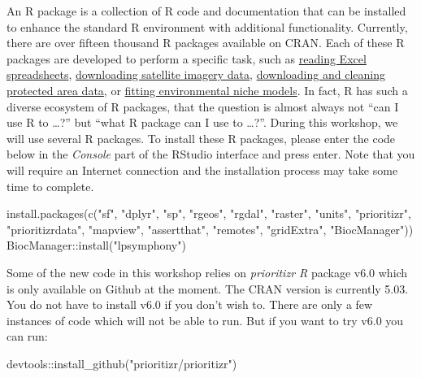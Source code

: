 \documentclass[
  12pt,
]{book}
\newenvironment{Shaded}{\begin{snugshade}}{\end{snugshade}}
\newcommand{\FunctionTok}[1]{\textcolor[rgb]{0.00,0.00,0.00}{#1}}
\newcommand{\NormalTok}[1]{#1}
\newcommand{\SpecialCharTok}[1]{\textcolor[rgb]{0.00,0.00,0.00}{#1}}
\newcommand{\StringTok}[1]{\textcolor[rgb]{0.31,0.60,0.02}{#1}}
\begin{document}
An R package is a collection of R code and documentation that can be installed to enhance the standard R environment with additional functionality. Currently, there are over fifteen thousand R packages available on CRAN. Each of these R packages are developed to perform a specific task, such as \href{https://cran.r-project.org/web/packages/readxl/index.html}{reading Excel spreadsheets}, \href{https://cran.r-project.org/web/packages/MODIStsp/index.html}{downloading satellite imagery data}, \href{https://cran.r-project.org/web/packages/wdpar/index.html}{downloading and cleaning protected area data}, or \href{https://cran.r-project.org/web/packages/ENMeval/index.html}{fitting environmental niche models}. In fact, R has such a diverse ecosystem of R packages, that the question is almost always not ``can I use R to \ldots?'' but ``what R package can I use to \ldots?''. During this workshop, we will use several R packages. To install these R packages, please enter the code below in the \emph{Console} part of the RStudio interface and press enter. Note that you will require an Internet connection and the installation process may take some time to complete.

\begin{Shaded}
\begin{Highlighting}[]
\FunctionTok{install.packages}\NormalTok{(}\FunctionTok{c}\NormalTok{(}\StringTok{"sf"}\NormalTok{, }\StringTok{"dplyr"}\NormalTok{, }\StringTok{"sp"}\NormalTok{, }\StringTok{"rgeos"}\NormalTok{, }\StringTok{"rgdal"}\NormalTok{, }\StringTok{"raster"}\NormalTok{,}
                   \StringTok{"units"}\NormalTok{, }\StringTok{"prioritizr"}\NormalTok{, }\StringTok{"prioritizrdata"}\NormalTok{,}
                   \StringTok{"mapview"}\NormalTok{, }\StringTok{"assertthat"}\NormalTok{, }\StringTok{"remotes"}\NormalTok{, }\StringTok{"gridExtra"}\NormalTok{,}
                   \StringTok{"BiocManager"}\NormalTok{))}
\NormalTok{BiocManager}\SpecialCharTok{::}\FunctionTok{install}\NormalTok{(}\StringTok{"lpsymphony"}\NormalTok{)}
\end{Highlighting}
\end{Shaded}

Some of the new code in this workshop relies on \emph{prioritizr R} package v6.0 which is only available on Github at the moment. The CRAN version is currently 5.03. You do not have to install v6.0 if you don't wish to. There are only a few instances of code which will not be able to run. But if you want to try v6.0 you can run:

\begin{Shaded}
\begin{Highlighting}[]
\NormalTok{devtools}\SpecialCharTok{::}\FunctionTok{install\_github}\NormalTok{(}\StringTok{"prioritizr/prioritizr"}\NormalTok{)}
\end{Highlighting}
\end{Shaded}
\end{document}
